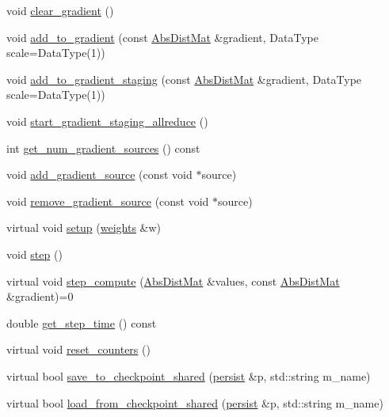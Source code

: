 \begin{DoxyCompactItemize}
\item 
void \hyperlink{classlbann_1_1optimizer_a3f41360479fbd46c704342bb4ef36d09}{clear\+\_\+gradient} ()
\item 
void \hyperlink{classlbann_1_1optimizer_a435d31e3b7a0302e36439ee36f62dba8}{add\+\_\+to\+\_\+gradient} (const \hyperlink{base_8hpp_a9a697a504ae84010e7439ffec862b470}{Abs\+Dist\+Mat} \&gradient, Data\+Type scale=Data\+Type(1))
\item 
void \hyperlink{classlbann_1_1optimizer_ac23ebde61a225f70c27ab937df5755ed}{add\+\_\+to\+\_\+gradient\+\_\+staging} (const \hyperlink{base_8hpp_a9a697a504ae84010e7439ffec862b470}{Abs\+Dist\+Mat} \&gradient, Data\+Type scale=Data\+Type(1))
\item 
void \hyperlink{classlbann_1_1optimizer_a1fe495ccbd62d50735615818abecf454}{start\+\_\+gradient\+\_\+staging\+\_\+allreduce} ()
\item 
int \hyperlink{classlbann_1_1optimizer_a91370e4de6083e7cd464c809cf583eb3}{get\+\_\+num\+\_\+gradient\+\_\+sources} () const
\item 
void \hyperlink{classlbann_1_1optimizer_ade46d28f7df19cab6c6ee90c03e976ea}{add\+\_\+gradient\+\_\+source} (const void $\ast$source)
\item 
void \hyperlink{classlbann_1_1optimizer_a68ba7515d7eb4af38ff19607c13a111b}{remove\+\_\+gradient\+\_\+source} (const void $\ast$source)
\item 
virtual void \hyperlink{classlbann_1_1optimizer_a7641a88b3c166df2d974a298622b992b}{setup} (\hyperlink{classlbann_1_1weights}{weights} \&w)
\item 
void \hyperlink{classlbann_1_1optimizer_aa9f43ca3f22edc0a25d0509b6514a411}{step} ()
\item 
virtual void \hyperlink{classlbann_1_1optimizer_a0db72c298a0bc3405fb0af97d104a036}{step\+\_\+compute} (\hyperlink{base_8hpp_a9a697a504ae84010e7439ffec862b470}{Abs\+Dist\+Mat} \&values, const \hyperlink{base_8hpp_a9a697a504ae84010e7439ffec862b470}{Abs\+Dist\+Mat} \&gradient)=0
\item 
double \hyperlink{classlbann_1_1optimizer_afef81d54e836ba0177f7a411ba3aaf6e}{get\+\_\+step\+\_\+time} () const
\item 
virtual void \hyperlink{classlbann_1_1optimizer_a067709debd4d2e7bfe1a35b5f6ced668}{reset\+\_\+counters} ()
\item 
virtual bool \hyperlink{classlbann_1_1optimizer_afed10c6d8c5bd922f95075abeff711ce}{save\+\_\+to\+\_\+checkpoint\+\_\+shared} (\hyperlink{classlbann_1_1persist}{persist} \&p, std\+::string m\+\_\+name)
\item 
virtual bool \hyperlink{classlbann_1_1optimizer_a42a52aab9a682fda57c1e639968a44b9}{load\+\_\+from\+\_\+checkpoint\+\_\+shared} (\hyperlink{classlbann_1_1persist}{persist} \&p, std\+::string m\+\_\+name)
\end{DoxyCompactItemize}
